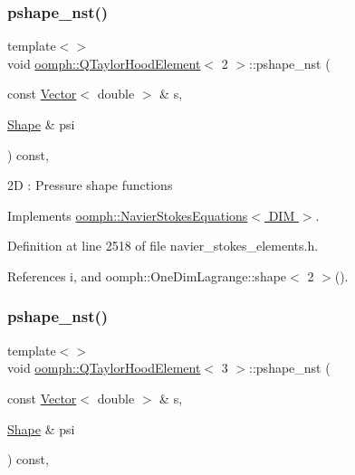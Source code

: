 \subsubsection{\texorpdfstring{pshape\+\_\+nst()}{pshape\_nst()}\hspace{0.1cm}{\footnotesize\ttfamily [3/4]}}
{\footnotesize\ttfamily template$<$$>$ \\
void \hyperlink{classoomph_1_1QTaylorHoodElement}{oomph\+::\+Q\+Taylor\+Hood\+Element}$<$ 2 $>$\+::pshape\+\_\+nst (\begin{DoxyParamCaption}\item[{const \hyperlink{classoomph_1_1Vector}{Vector}$<$ double $>$ \&}]{s,  }\item[{\hyperlink{classoomph_1_1Shape}{Shape} \&}]{psi }\end{DoxyParamCaption}) const\hspace{0.3cm}{\ttfamily [inline]}, {\ttfamily [virtual]}}

2D \+: Pressure shape functions 

Implements \hyperlink{classoomph_1_1NavierStokesEquations_a487030303b71da299aed3d4639a022ab}{oomph\+::\+Navier\+Stokes\+Equations$<$ D\+I\+M $>$}.



Definition at line 2518 of file navier\+\_\+stokes\+\_\+elements.\+h.



References i, and oomph\+::\+One\+Dim\+Lagrange\+::shape$<$ 2 $>$().

\mbox{\label{classoomph_1_1QTaylorHoodElement_abc75cdb4d6a56f9def855c04b7c912fd}} 
\subsubsection{\texorpdfstring{pshape\+\_\+nst()}{pshape\_nst()}\hspace{0.1cm}{\footnotesize\ttfamily [4/4]}}
{\footnotesize\ttfamily template$<$$>$ \\
void \hyperlink{classoomph_1_1QTaylorHoodElement}{oomph\+::\+Q\+Taylor\+Hood\+Element}$<$ 3 $>$\+::pshape\+\_\+nst (\begin{DoxyParamCaption}\item[{const \hyperlink{classoomph_1_1Vector}{Vector}$<$ double $>$ \&}]{s,  }\item[{\hyperlink{classoomph_1_1Shape}{Shape} \&}]{psi }\end{DoxyParamCaption}) const\hspace{0.3cm}{\ttfamily [inline]}, {\ttfamily [virtual]}}

